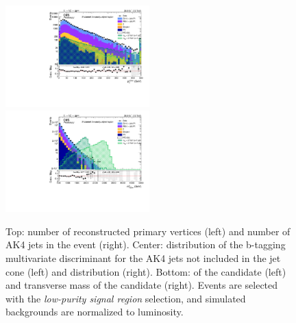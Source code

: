 \begin{figure}[!htb]
\begin{center}
    \includegraphics[width=0.495\textwidth]{plots/v9_U/XVZnnlpSR/X_pt.pdf}
    \includegraphics[width=0.495\textwidth]{plots/v9_U/XVZnnlpSR/X_tmass.pdf}

    \caption{Top: number of reconstructed primary vertices (left) and number of AK4 jets in the event (right). Center: distribution of the b-tagging multivariate discriminant for the AK4 jets not included in the \V jet cone (left) and \MET distribution (right). Bottom: \pt of the \VZ candidate (left) and transverse mass of the \VZ candidate (right). Events are selected with the \emph{low-purity signal region} selection, and simulated backgrounds are normalized to luminosity.}
  \end{center}
\end{figure}


